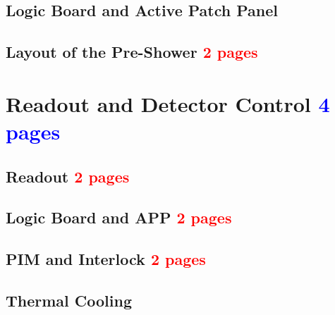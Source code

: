 		
		
		
		
		 
		
		\subsection{Logic Board and Active Patch Panel}
		
		
		
		
		
		
		\subsection{Layout of the Pre-Shower  \textcolor{red}{ 2 pages}}
		
		
		
		
		
		
		
		
		
		
		
		
		
		
		
		
		
		
		
		
		
		
		
		
		
		
		
		
		
		
		
		
		
		
		
		
		
		
	\clearpage	
	\section{Readout and Detector Control  \textcolor{blue}{ 4 pages}}
		\subsection{Readout \textcolor{red}{ 2 pages}}
		\subsection{Logic Board and APP \textcolor{red}{ 2 pages}}
		\subsection{PIM and Interlock \textcolor{red}{ 2 pages}}
		\subsection{Thermal Cooling}